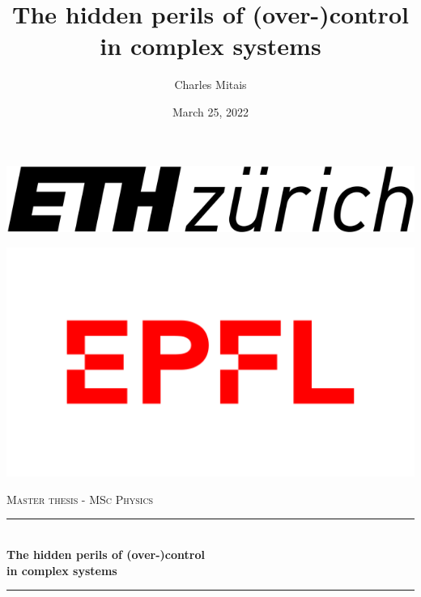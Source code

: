 \documentclass[a4paper, 11pt]{report}
\def\monthyear{\ifcase\month\or
  January\or February\or March\or April\or May\or June\or
  July\or August\or September\or October\or November\or December\fi
  \space\number\year}
\newcommand{\HRule}{\rule{\linewidth}{0.4mm}} %
\begin{document}

\title{The hidden perils of (over-)control in complex systems}
\author{Charles Mitais}
\date{March 25, 2022}

\begin{titlepage}
\begin{adjustwidth}{0cm}{-1.85cm}
\begin{minipage}{0.5\textwidth}%
\includegraphics[width=1\textwidth]{logo-ethz-2}%
\end{minipage}
\hfill
\begin{minipage}{0.5\textwidth}%
\includegraphics[width=.85\textwidth]{logo-epfl}%
\end{minipage}
\end{adjustwidth}

\vspace{2.7cm}

\centering
\textsc{\large Master thesis - MSc Physics}\\[0.5cm] %

\HRule \\[0.4cm]
{ \Large \bfseries The hidden perils of (over-)control \\in complex systems }\\[0.4cm] %
\HRule \\[1.2cm]


\end{titlepage}
\end{document}
